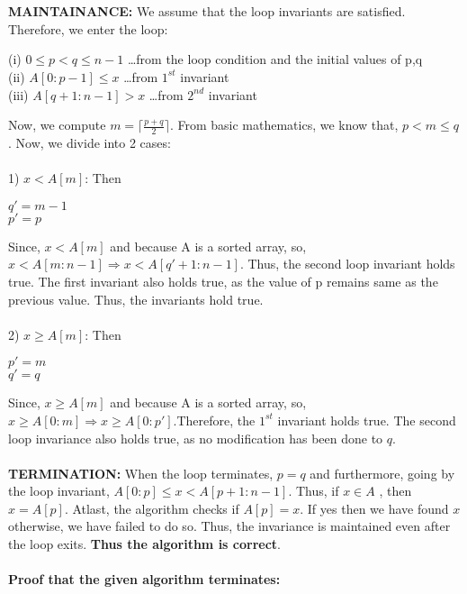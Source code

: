 \documentclass{article}
\begin{document}
\\
\\
\textbf{MAINTAINANCE:} We assume that the loop invariants are satisfied. Therefore, we enter the loop:
\\
\begin{center}
   (i) $0\leq p<q \leq n-1$ \quad \ldots from the loop condition and the initial values of p,q\\
   (ii) $A[0:p-1] \leq x $ \quad \ldots from $1^{st}$ invariant\\
   (iii) $A[q+1:n-1]>x $ \quad \ldots from $2^{nd}$ invariant\\ 
\end{center}
\leavevmode
Now, we compute $m=\lceil \frac{p+q}{2} \rceil $. From basic mathematics, we know that, $p<m\leq q$. Now, we divide into 2 cases:
\\
\\
1) $x<A[m]$: Then
\begin{center}
    $q'=m-1$\\
    $p'=p$\\
\end{center}
Since, $x<A[m]$ and because A is a sorted array, so,  $x<A[m:n-1] \Rightarrow x<A[q'+1:n-1]$. Thus, the second loop invariant holds true.
The first invariant also holds true, as the value of p remains same as the previous value. Thus, the invariants hold true.
\\
\\
2) $x \geq A[m]$: Then
\begin{center}
    $p'=m$ \\
    $q'=q$\\
\end{center}
Since, $x \geq A[m]$ and because A is a sorted array, so, $x\geq A[0:m] \Rightarrow x\geq A[0:p']$.Therefore, the $1^{st}$ invariant holds true. The second loop invariance also holds true, as no modification has been done to $q$.
\leavevmode
\\
\\
\textbf{TERMINATION:} When the loop terminates, $p=q$ and furthermore, going by the loop invariant, $A[0:p]\leq x < A[p+1:n-1]$. Thus, if $x \in A$ , then $x=A[p]$. Atlast, the algorithm checks if $A[p]=x$. If yes then we have found $x$ otherwise, we have failed to do so.
Thus, the invariance is maintained even after the loop exits. \textbf{Thus the algorithm is correct}.
\\
\\
\textbf{Proof that the given algorithm terminates:}
\\
\end{document}
